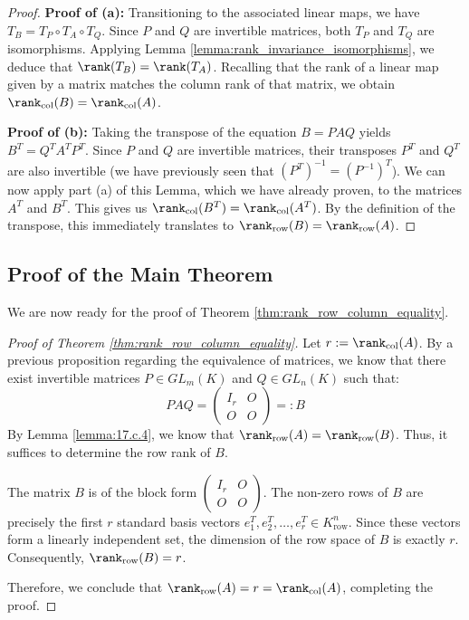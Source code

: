 \begin{proof}
\textbf{Proof of (a):} Transitioning to the associated linear maps, we have $T_B = T_P \circ T_A \circ T_Q$. Since $P$ and $Q$ are invertible matrices, both $T_P$ and $T_Q$ are isomorphisms. Applying Lemma \ref{lemma:rank_invariance_isomorphisms}, we deduce that $\rank(T_B) = \rank(T_A)$. Recalling that the rank of a linear map given by a matrix matches the column rank of that matrix, we obtain $\rank_{\text{col}}(B) = \rank_{\text{col}}(A)$.

\textbf{Proof of (b):} Taking the transpose of the equation $B = PAQ$ yields $B^T = Q^T A^T P^T$. Since $P$ and $Q$ are invertible matrices, their transposes $P^T$ and $Q^T$ are also invertible (we have previously seen that $(P^T)^{-1} = (P^{-1})^T$). We can now apply part (a) of this Lemma, which we have already proven, to the matrices $A^T$ and $B^T$. This gives us $\rank_{\text{col}}(B^T) = \rank_{\text{col}}(A^T)$. By the definition of the transpose, this immediately translates to $\rank_{\text{row}}(B) = \rank_{\text{row}}(A)$.
\end{proof}

\subsection{Proof of the Main Theorem}

We are now ready for the proof of Theorem \ref{thm:rank_row_column_equality}.

\begin{proof}[Proof of Theorem \ref{thm:rank_row_column_equality}]
Let $r := \rank_{\text{col}}(A)$. By a previous proposition regarding the equivalence of matrices, we know that there exist invertible matrices $P \in GL_m(K)$ and $Q \in GL_n(K)$ such that:
\begin{equation*}
    P A Q = \begin{pmatrix} I_r & O \\ O & O \end{pmatrix} =: B
\end{equation*}
By Lemma \ref{lemma:17.c.4}, we know that $\rank_{\text{row}}(A) = \rank_{\text{row}}(B)$. Thus, it suffices to determine the row rank of $B$.

The matrix $B$ is of the block form $\left(\begin{smallmatrix} I_r & O \\ O & O \end{smallmatrix}\right)$. The non-zero rows of $B$ are precisely the first $r$ standard basis vectors $e_1^T, e_2^T, \dots, e_r^T \in K_{\text{row}}^n$. Since these vectors form a linearly independent set, the dimension of the row space of $B$ is exactly $r$. Consequently, $\rank_{\text{row}}(B) = r$.

Therefore, we conclude that $\rank_{\text{row}}(A) = r = \rank_{\text{col}}(A)$, completing the proof.
\end{proof}

